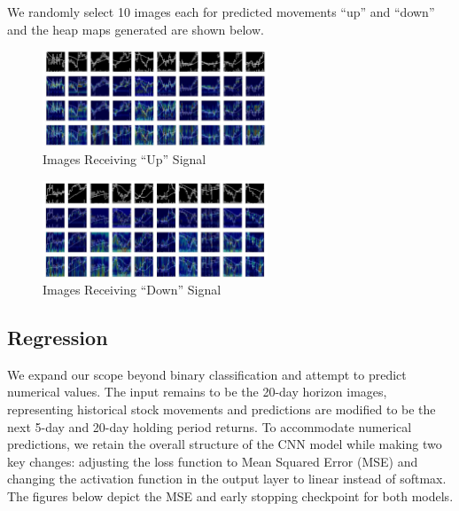 \documentclass{article}
\begin{document}
We randomly select 10 images each for predicted movements “up” and “down” and the heap maps generated are shown below.

\begin{figure}[!ht]
	\centering
 \includegraphics[width=0.6\textwidth]{8_1Images Receiving “Up” Signal(classification).jpg}
	\caption{Images Receiving “Up” Signal}
\end{figure}

\begin{figure}[!ht]
	\centering
	\includegraphics[width=0.6\textwidth]{8_2Images Receiving “Down” Signal(classification).jpg}
	\caption{Images Receiving “Down” Signal}
\end{figure}

\subsection{Regression}
We expand our scope beyond binary classification and attempt to predict numerical values. The input remains to be the 20-day horizon images, representing historical stock movements and predictions are modified to be the next 5-day and 20-day holding period returns. To accommodate numerical predictions, we retain the overall structure of the CNN model while making two key changes: adjusting the loss function to Mean Squared Error (MSE) and changing the activation function in the output layer to linear instead of softmax. The figures below depict the MSE and early stopping checkpoint for both models.
\end{document}
